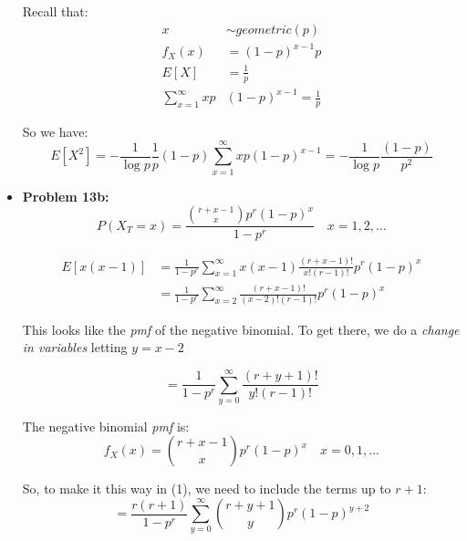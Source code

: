 \documentclass{article}
\begin{document}
\begin{itemize}
    Recall that:
    \begin{equation*}
        \begin{split}
            x &\sim geometric(p) \\
            f_X(x) &= (1-p)^{x-1}p\\
            E[X] &= \frac{1}{p}\\
            \sum_{x=1}^\infty xp&(1-p)^{x-1} = \frac{1}{p}
        \end{split}
    \end{equation*}
    
    So we have:
    \begin{equation*}
        E[X^2] = -\frac{1}{\log p} \frac{1}{p}(1-p) \sum_{x=1}^\infty xp(1-p)^{x-1} = -\frac{1}{\log p} \frac{(1-p)}{p^2}
    \end{equation*}
    
    \item \textbf{Problem 13b:} 
    \begin{equation*}
        P(X_T = x) = \frac{{r+x-1\choose x} p^r (1-p)^x}{1-p^r} \quad x = 1,2,...
    \end{equation*}
    
    \begin{equation*}
    \begin{split}
        E[x(x-1)] &= \frac{1}{1-p^r} \sum_{x=1}^\infty x(x-1)\frac{(r+x-1)!}{x!(r-1)!}p^r(1-p)^x \\
        &= \frac{1}{1-p^r} \sum_{x=2}^\infty \frac{(r+x-1)!}{(x-2)!(r-1)!}p^r(1-p)^x
    \end{split}
    \end{equation*}
    
    This looks like the \textit{pmf} of the negative binomial. To get there, we do a \textit{change in variables} letting $y = x-2$
    
    \begin{equation}
        = \frac{1}{1-p^r} \sum_{y=0}^\infty \frac{(r+y+1)!}{y!(r-1)!}
    \end{equation}
    
    The negative binomial \textit{pmf} is:
    \begin{equation*}
        f_X(x) = {r+x-1 \choose x} p^r (1-p)^x \quad x = 0,1,...
    \end{equation*}
    
    So, to make it this way in (1), we need to include the terms up to $r+1$:
    \begin{equation}
        = \frac{r(r+1)}{1-p^r} \sum_{y=0}^\infty {r+y+1 \choose y} p^r (1-p)^{y+2}
    \end{equation}
    

\end{itemize}
\end{document}
